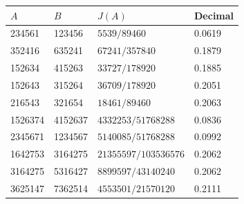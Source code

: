 \begin{tabular}{@{}llll@{}}
\toprule
$A$&$B$&$J(A)$&Decimal\\
\midrule
234561&123456&$5539/89460$&0.0619\\
352416&635241&$67241/357840$&0.1879\\
152634&415263&$33727/178920$&0.1885\\
152643&315264&$36709/178920$&0.2051\\
216543&321654&$18461/89460$&0.2063\\
\midrule
1526374&4152637&$4332253/51768288$&0.0836\\
2345671&1234567&$5140085/51768288$&0.0992\\
1642753&3164275&$21355597/103536576$&0.2062\\
3164275&5316427&$8899597/43140240$&0.2062\\
3625147&7362514&$4553501/21570120$&0.2111\\
\bottomrule
\end{tabular}
